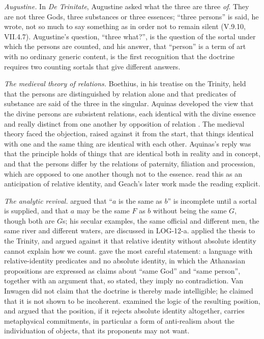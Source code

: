 \documentclass{situationist-preprint}
\begin{document}
\emph{Augustine.} In \emph{De Trinitate}, Augustine asked what the three are three \emph{of}. They are not three Gods, three substances or three essences; \enquote{three persons} is said, he wrote, not so much to say something as in order not to remain silent (V.9.10, VII.4.7). Augustine's question, \enquote{three what?}, is the question of the sortal under which the persons are counted, and his answer, that \enquote{person} is a term of art with no ordinary generic content, is the first recognition that the doctrine requires two counting sortals that give different answers.

\emph{The medieval theory of relations.} Boethius, in his treatise on the Trinity, held that the persons are distinguished by relation alone and that predicates of substance are said of the three in the singular. Aquinas developed the view that the divine persons are subsistent relations, each identical with the divine essence and really distinct from one another by opposition of relation \citep[I, qq.~28--30]{Aquinas}. The medieval theory faced the objection, raised against it from the start, that things identical with one and the same thing are identical with each other. Aquinas's reply was that the principle holds of things that are identical both in reality and in concept, and that the persons differ by the relations of paternity, filiation and procession, which are opposed to one another though not to the essence. \citet{AnscombeGeach1961} read this as an anticipation of relative identity, and Geach's later work made the reading explicit.

\emph{The analytic revival.} \citet{Geach1962} argued that \enquote{$a$ is the same as $b$} is incomplete until a sortal is supplied, and that $a$ may be the same $F$ as $b$ without being the same $G$, though both are $G$s; his secular examples, the same official and different men, the same river and different waters, are discussed in LOG-12-a. \citet{Martinich1978} applied the thesis to the Trinity, and \citet{Cartwright1987} argued against it that relative identity without absolute identity cannot explain how we count. \citet{vanInwagen1988} gave the most careful statement: a language with relative-identity predicates and no absolute identity, in which the Athanasian propositions are expressed as claims about \enquote{same God} and \enquote{same person}, together with an argument that, so stated, they imply no contradiction. Van Inwagen did not claim that the doctrine is thereby made intelligible; he claimed that it is not shown to be incoherent. \citet{Cain1989} examined the logic of the resulting position, and \citet{Rea2003} argued that the position, if it rejects absolute identity altogether, carries metaphysical commitments, in particular a form of anti-realism about the individuation of objects, that its proponents may not want.
\end{document}
